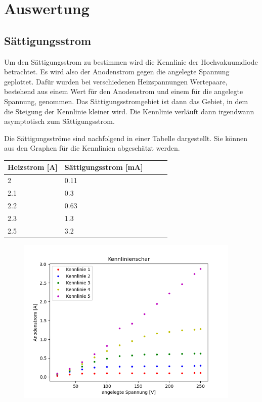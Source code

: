 \section{Auswertung}

\subsection{Sättigungsstrom}

Um den Sättigungsstrom zu bestimmen wird die Kennlinie der Hochvakuumdiode betrachtet. Es wird also der Anodenstrom gegen die angelegte Spannung geplottet. Dafür wurden bei verschiedenen Heizspannungen Wertepaare, bestehend aus einem Wert für den Anodenstrom und einem für die angelegte Spannung, genommen. Das Sättigungsstromgebiet ist dann das Gebiet, in dem die Steigung der Kennlinie kleiner wird. Die Kennlinie verläuft dann irgendwann asymptotisch zum Sättigungsstrom.

\noindent Die Sättigungsströme sind nachfolgend in einer Tabelle dargestellt. Sie können aus den Graphen für die Kennlinien abgeschätzt werden.

\begin{minipage}{\linewidth}
    \begin{table}[H]
        \centering
    
    \begin{tabular}{lllll}
        \toprule
        Heizstrom [A] & Sättigungsstrom [mA]\\
        \midrule
        2 & 0.11 \\
        2.1 & 0.3 \\
        2.2 & 0.63 \\
        2.3 & 1.3 \\
        2.5 & 3.2 \\
        \bottomrule   
    \end{tabular}
    \label{tab:1}
\end{table}
\end{minipage}

\begin{figure}[H]
    \centering
    \includegraphics[height=8cm]{"Kennlinie1.png"}
\end{figure}

